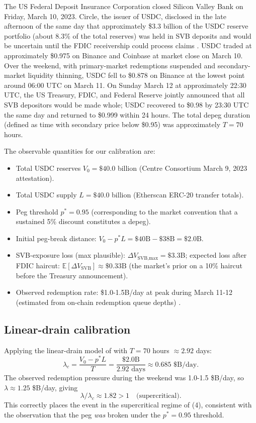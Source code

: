 \documentclass[11pt,a4paper]{article}
\theoremstyle{plain}
\theoremstyle{definition}
\newcommand{\E}{\mathbb{E}}
\begin{document}
The US Federal Deposit Insurance Corporation closed Silicon Valley Bank on Friday, March 10, 2023.
Circle, the issuer of USDC, disclosed in the late afternoon of the same day that approximately \$3.3 billion of the USDC reserve portfolio (about 8.3\% of the total reserves) was held in SVB deposits and would be uncertain until the FDIC receivership could process claims \cite{LyonsViswanathNatraj2023}.
USDC traded at approximately \$0.975 on Binance and Coinbase at market close on March 10.
Over the weekend, with primary-market redemptions suspended and secondary-market liquidity thinning, USDC fell to \$0.878 on Binance at the lowest point around 06:00 UTC on March 11.
On Sunday March 12 at approximately 22:30 UTC, the US Treasury, FDIC, and Federal Reserve jointly announced that all SVB depositors would be made whole; USDC recovered to \$0.98 by 23:30 UTC the same day and returned to \$0.999 within 24 hours.
The total depeg duration (defined as time with secondary price below \$0.95) was approximately $T = 70$ hours.

The observable quantities for our calibration are:
\begin{itemize}
\item Total USDC reserves $V_0 = \$40.0$ billion (Centre Consortium March 9, 2023 attestation).
\item Total USDC supply $L = \$40.0$ billion (Etherscan ERC-20 transfer totals).
\item Peg threshold $p^* = 0.95$ (corresponding to the market convention that a sustained 5\% discount constitutes a depeg).
\item Initial peg-break distance: $V_0 - p^*L = \$40\text{B} - \$38\text{B} = \$2.0$B.
\item SVB-exposure loss (max plausible): $\Delta V_{\text{SVB,max}} = \$3.3$B; expected loss after FDIC haircut: $\E[\Delta V_{\text{SVB}}] \approx \$0.33\text{B}$ (the market's prior on a 10\% haircut before the Treasury announcement).
\item Observed redemption rate: \$1.0-1.5B/day at peak during March 11-12 (estimated from on-chain redemption queue depths) \cite{MohantyKrishnamachari2026}.
\end{itemize}

\subsection{Linear-drain calibration}

Applying the linear-drain model of  with $T = 70$ hours $\approx 2.92$ days:
$$\lambda_c = \frac{V_0 - p^*L}{T} = \frac{\$2.0\text{B}}{2.92\text{ days}} \approx 0.685\text{ \$B/day}.$$
The observed redemption pressure during the weekend was 1.0-1.5 \$B/day, so $\lambda \approx 1.25$ \$B/day, giving
$$\lambda/\lambda_c \approx 1.82 > 1\quad\text{(supercritical)}.$$
This correctly places the event in the supercritical regime of (4), consistent with the observation that the peg \emph{was} broken under the $p^* = 0.95$ threshold.
\end{document}

